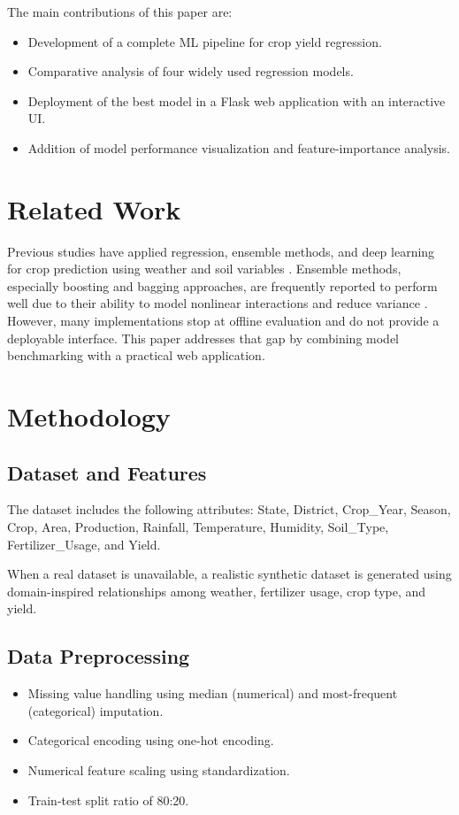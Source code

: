 \documentclass[conference]{IEEEtran}
\begin{document}
The main contributions of this paper are:
\begin{itemize}
    \item Development of a complete ML pipeline for crop yield regression.
    \item Comparative analysis of four widely used regression models.
    \item Deployment of the best model in a Flask web application with an interactive UI.
    \item Addition of model performance visualization and feature-importance analysis.
\end{itemize}

\section{Related Work}
Previous studies have applied regression, ensemble methods, and deep learning for crop prediction using weather and soil variables \cite{doe2022,smith2021}. Ensemble methods, especially boosting and bagging approaches, are frequently reported to perform well due to their ability to model nonlinear interactions and reduce variance \cite{brown2020}. However, many implementations stop at offline evaluation and do not provide a deployable interface. This paper addresses that gap by combining model benchmarking with a practical web application.

\section{Methodology}

\subsection{Dataset and Features}
The dataset includes the following attributes: State, District, Crop\_Year, Season, Crop, Area, Production, Rainfall, Temperature, Humidity, Soil\_Type, Fertilizer\_Usage, and Yield.

When a real dataset is unavailable, a realistic synthetic dataset is generated using domain-inspired relationships among weather, fertilizer usage, crop type, and yield.

\subsection{Data Preprocessing}
\begin{itemize}
    \item Missing value handling using median (numerical) and most-frequent (categorical) imputation.
    \item Categorical encoding using one-hot encoding.
    \item Numerical feature scaling using standardization.
    \item Train-test split ratio of 80:20.
\end{itemize}
\end{document}
